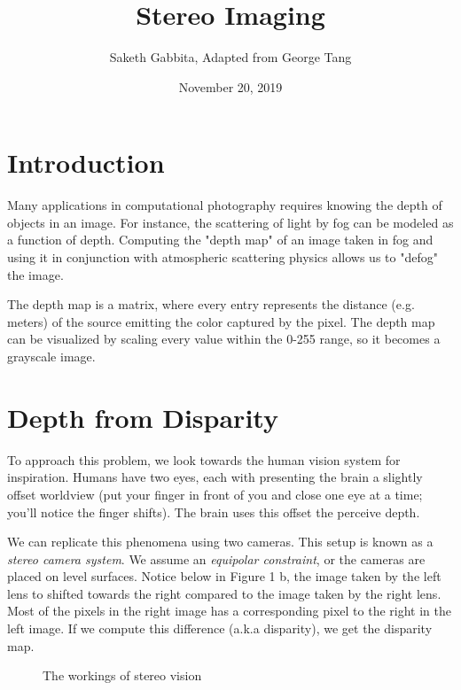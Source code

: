 \documentclass{article}
\title{Stereo Imaging}
\author{Saketh Gabbita, Adapted from George Tang}
\date{November 20, 2019}
\begin{document}
\maketitle

\section{Introduction}
Many applications in computational photography requires knowing the depth of objects in an image. For instance, the scattering of light by fog can be modeled as a function of depth. Computing the "depth map" of an image taken in fog and using it in conjunction with atmospheric scattering physics allows us to "defog" the image. 

The depth map is a matrix, where every entry represents the distance (e.g. meters) of the source emitting the color captured by the pixel. The depth map can be visualized by scaling every value within the 0-255 range, so it becomes a grayscale image. 

\section{Depth from Disparity}
To approach this problem, we look towards the human vision system for inspiration. Humans have two eyes, each with presenting the brain a slightly offset worldview (put your finger in front of you and close one eye at a time; you'll notice the finger shifts). The brain uses this offset the perceive depth. 

We can replicate this phenomena using two cameras. This setup is known as a \textit{stereo camera system}. We assume an \textit{equipolar constraint}, or the cameras are placed on level surfaces. Notice below in Figure 1 b, the image taken by the left lens to shifted towards the right compared to the image taken by the right lens. Most of the pixels in the right image has a corresponding pixel to the right in the left image. If we compute this difference (a.k.a disparity), we get the disparity map. 

\begin{figure}[!htbp]
 \centering
    \qquad
    \caption{The workings of stereo vision}%
    \label{fig:example}%
\end{figure}
\end{document}
